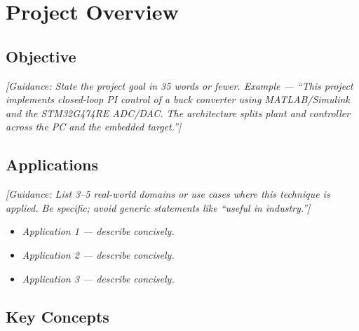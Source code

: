 \newpage
\tableofcontents
\newpage

\section{Project Overview}

\subsection{Objective}

\textit{[Guidance: State the project goal in 35 words or fewer.
Example --- ``This project implements closed-loop PI control of a
buck converter using MATLAB/Simulink and the STM32G474RE ADC/DAC.
The architecture splits plant and controller across the PC and
the embedded target.'']}

\subsection{Applications}

\textit{[Guidance: List 3--5 real-world domains or use cases
where this technique is applied. Be specific; avoid generic
statements like ``useful in industry.'']}

\begin{itemize}
    \item \textit{Application 1 --- describe concisely.}
    \item \textit{Application 2 --- describe concisely.}
    \item \textit{Application 3 --- describe concisely.}
\end{itemize}

\subsection{Key Concepts}

